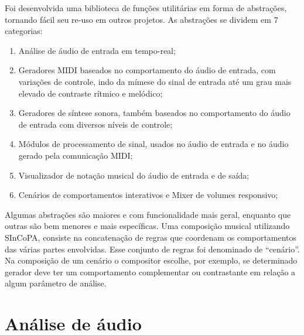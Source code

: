 \documentclass{ppgmus}
\begin{document}
  Foi desenvolvida uma biblioteca de funções utilitárias em forma de abstrações, 
tornando fácil seu re-uso em outros projetos. As abstrações se dividem em 7 categorias:

\begin{enumerate}
 \item Análise de áudio de entrada em tempo-real;
 \item Geradores MIDI baseados no comportamento do áudio de 
entrada, com variações de controle, indo da mímese do sinal de entrada
até um grau mais elevado de contraste rítmico e melódico;
 \item Geradores de síntese sonora, também baseados no comportamento
do áudio de entrada com diversos níveis de controle;
 \item Módulos de processamento de sinal, usados no áudio de entrada e no
áudio gerado pela comunicação MIDI;
 \item Visualizador de notação musical do áudio de entrada e de saída;
 \item Cenários de comportamentos interativos e Mixer de volumes responsivo;
 
\end{enumerate}

Algumas abstrações são maiores e com funcionalidade mais geral, enquanto
que outras são bem menores e mais específicas.
Uma composição musical utilizando SInCoPA, consiste na concatenação de
regras que coordenam os comportamentos das várias partes envolvidas.
Esse conjunto de regras foi denominado de ``cenário''. Na composição
de um cenário o compositor escolhe, por exemplo,  se determinado gerador 
deve ter um comportamento complementar ou contrastante  em relação a algum
parâmetro de análise.









\section{Análise de áudio}
\end{document}
